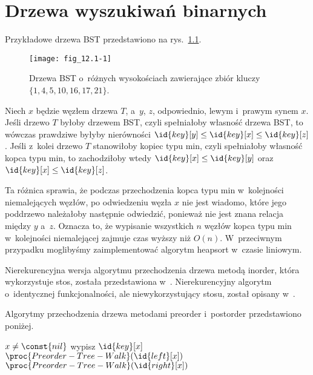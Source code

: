 \chapter{Drzewa wyszukiwań binarnych}


\exercise %
Przykładowe drzewa BST przedstawiono na rys.~\ref{fig:12.1-1}.
\begin{figure}[ht]
	\begin{center}
		\texttt{[image: fig\_12.1-1]}
	\end{center}
	\caption{Drzewa BST o~różnych wysokościach zawierające zbiór kluczy $\{1,4,5,10,16,17,21\}$.} \label{fig:12.1-1}
\end{figure}

\exercise %

\noindent Niech $x$ będzie węzłem drzewa $T$, a~$y$, $z$, odpowiednio, lewym i~prawym synem $x$. Jeśli drzewo $T$ byłoby drzewem BST, czyli spełniałoby własność drzewa BST, to wówczas prawdziwe byłyby nierówności $\id{key}[y]\le\id{key}[x]\le\id{key}[z]$. Jeśli z~kolei drzewo $T$ stanowiłoby kopiec typu min, czyli spełniałoby własność kopca typu min, to zachodziłoby wtedy $\id{key}[x]\le\id{key}[y]$ oraz $\id{key}[x]\le\id{key}[z]$.

Ta różnica sprawia, że podczas przechodzenia kopca typu min w~kolejności niemalejących węzłów, po odwiedzeniu węzła $x$ nie jest wiadomo, które jego poddrzewo należałoby następnie odwiedzić, ponieważ nie jest znana relacja między $y$ a~$z$. Oznacza to, że wypisanie wszystkich $n$ węzłów kopca typu min w~kolejności niemalejącej zajmuje czas wyższy niż $O(n)$. W~przeciwnym przypadku moglibyśmy zaimplementować algorytm heapsort w~czasie liniowym.

\exercise %
Nierekurencyjna wersja algorytmu przechodzenia drzewa metodą inorder, która wykorzystuje stos, została przedstawiona w~. Nierekurencyjny algorytm o~identycznej funkcjonalności, ale niewykorzystujący stosu, został opisany w~.

\exercise %
Algorytmy przechodzenia drzewa metodami preorder i~postorder przedstawiono poniżej. 
\begin{codebox}
\li	\If $x\ne\const{nil}$
\li		\Then
			wypisz $\id{key}[x]$
\li			$\proc{Preorder-Tree-Walk}(\id{left}[x])$
\li			$\proc{Preorder-Tree-Walk}(\id{right}[x])$
		\End
\end{codebox}

